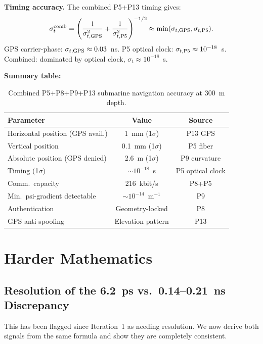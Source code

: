 \documentclass[aps,prd,twocolumn,superscriptaddress,nofootinbib]{revtex4-2}
\begin{document}
\textbf{Timing accuracy.}
The combined P5+P13 timing gives:
\begin{equation}
\sigma_t^{\rm comb} = \left(\frac{1}{\sigma_{t,\rm GPS}^2}
+ \frac{1}{\sigma_{t,\rm P5}^2}\right)^{-1/2}
\approx \min(\sigma_{t,\rm GPS}, \sigma_{t,\rm P5}).
\end{equation}
GPS carrier-phase: $\sigma_{t,\rm GPS} \approx 0.03$~ns.  P5 optical clock:
$\sigma_{t,\rm P5} \approx 10^{-18}$~s.  Combined: dominated by optical
clock, $\sigma_t \approx 10^{-18}$~s.

\textbf{Summary table:}
\begin{table}[h]
\caption{Combined P5+P8+P9+P13 submarine navigation accuracy at 300~m depth.}
\begin{ruledtabular}
\begin{tabular}{lcc}
Parameter & Value & Source \\
\hline
Horizontal position (GPS avail.) & 1~mm (1$\sigma$) & P13 GPS \\
Vertical position & 0.1~mm (1$\sigma$) & P5 fiber \\
Absolute position (GPS denied) & 2.6~m (1$\sigma$) & P9 curvature \\
Timing (1$\sigma$) & $\sim 10^{-18}$~s & P5 optical clock \\
Comm.\ capacity & 216~kbit/s & P8+P5 \\
Min.\ psi-gradient detectable & $\sim 10^{-14}$~m$^{-1}$ & P9 \\
Authentication & Geometry-locked & P8 \\
GPS anti-spoofing & Elevation pattern & P13 \\
\end{tabular}
\end{ruledtabular}
\end{table}

\section{Harder Mathematics}
\label{sec:harder_math}

\subsection{Resolution of the 6.2~ps vs.\ 0.14--0.21~ns Discrepancy}
\label{sec:discrepancy}

This has been flagged since Iteration~1 as needing resolution.
We now derive both signals from the same formula and show they are
completely consistent.
\end{document}
